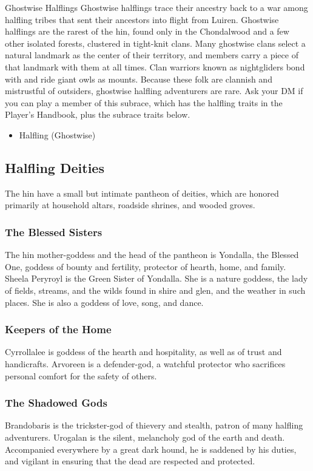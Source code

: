 \documentclass[10pt,a4paper,twoside,twocolumn,openany,bg=print,nodeprecatedcode]{dndbook}
\begin{document}
\begin{DndComment}{Ghostwise Halflings}
Ghostwise halflings trace their ancestry back to a war among halfling tribes that sent their ancestors into flight from Luiren. Ghostwise halflings are the rarest of the hin, found only in the Chondalwood and a few other isolated forests, clustered in tight-knit clans.
Many ghostwise clans select a natural landmark as the center of their territory, and members carry a piece of that landmark with them at all times. Clan warriors known as nightgliders bond with and ride giant owls as mounts.
Because these folk are clannish and mistrustful of outsiders, ghostwise halfling adventurers are rare. Ask your DM if you can play a member of this subrace, which has the halfling traits in the Player's Handbook, plus the subrace traits below.

\begin{itemize}
\item Halfling (Ghostwise)
\end{itemize}

\end{DndComment}

\subsection{Halfling Deities}
The hin have a small but intimate pantheon of deities, which are honored primarily at household altars, roadside shrines, and wooded groves.
\subsubsection{The Blessed Sisters}
The hin mother-goddess and the head of the pantheon is Yondalla, the Blessed One, goddess of bounty and fertility, protector of hearth, home, and family. Sheela Peryroyl is the Green Sister of Yondalla. She is a nature goddess, the lady of fields, streams, and the wilds found in shire and glen, and the weather in such places. She is also a goddess of love, song, and dance.
\subsubsection{Keepers of the Home}
Cyrrollalee is goddess of the hearth and hospitality, as well as of trust and handicrafts. Arvoreen is a defender-god, a watchful protector who sacrifices personal comfort for the safety of others.
\subsubsection{The Shadowed Gods}
Brandobaris is the trickster-god of thievery and stealth, patron of many halfling adventurers. Urogalan is the silent, melancholy god of the earth and death. Accompanied everywhere by a great dark hound, he is saddened by his duties, and vigilant in ensuring that the dead are respected and protected.
\end{document}
